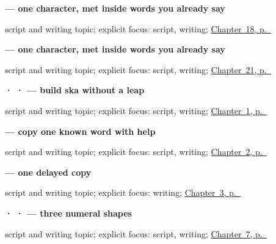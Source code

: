 \noindent\begin{minipage}[t]{\linewidth}
\raggedright
\textbf{ — one character, met inside words you already say}\par
\footnotesize script and writing topic; explicit focus: script, writing; \hyperref[ch:ml-telling-time]{Chapter~18, p.~\pageref*{ch:ml-telling-time}}
\end{minipage}\par\smallskip

\noindent\begin{minipage}[t]{\linewidth}
\raggedright
\textbf{ — one character, met inside words you already say}\par
\footnotesize script and writing topic; explicit focus: script, writing; \hyperref[ch:ml-dog-and-cat]{Chapter~21, p.~\pageref*{ch:ml-dog-and-cat}}
\end{minipage}\par\smallskip

\noindent\begin{minipage}[t]{\linewidth}
\raggedright
\textbf{ ·  ·  — build ska without a leap}\par
\footnotesize script and writing topic; explicit focus: script, writing; \hyperref[ch:greetings]{Chapter~1, p.~\pageref*{ch:greetings}}
\end{minipage}\par\smallskip

\noindent\begin{minipage}[t]{\linewidth}
\raggedright
\textbf{ — copy one known word with help}\par
\footnotesize script and writing topic; explicit focus: script, writing; \hyperref[ch:introductions]{Chapter~2, p.~\pageref*{ch:introductions}}
\end{minipage}\par\smallskip

\noindent\begin{minipage}[t]{\linewidth}
\raggedright
\textbf{ — one delayed copy}\par
\footnotesize script and writing topic; explicit focus: writing; \hyperref[ch:responding]{Chapter~3, p.~\pageref*{ch:responding}}
\end{minipage}\par\smallskip

\noindent\begin{minipage}[t]{\linewidth}
\raggedright
\textbf{ ·  ·  — three numeral shapes}\par
\footnotesize script and writing topic; explicit focus: script, writing; \hyperref[ch:ml-numbers-one-to-ten]{Chapter~7, p.~\pageref*{ch:ml-numbers-one-to-ten}}
\end{minipage}\par\smallskip

